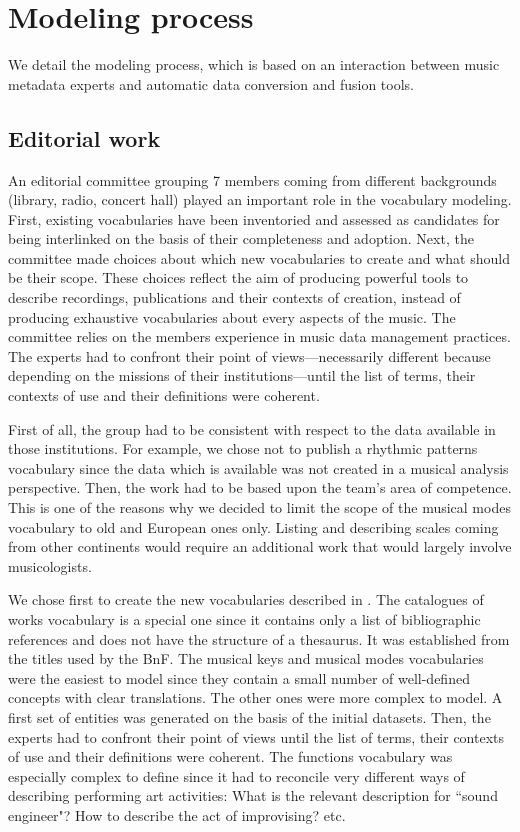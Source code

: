 \documentclass{article}
\newcommand{\etc}{etc.}
\begin{document}
\section{Modeling process}\label{sec:realisation}
We detail the modeling process, which is based on an interaction between music metadata experts and automatic data conversion and fusion tools.

\subsection{Editorial work}
An editorial committee grouping 7 members coming from different backgrounds (library, radio, concert hall) played an important role in the vocabulary modeling. First, existing vocabularies have been inventoried and assessed as candidates for being interlinked on the basis of their completeness and adoption. Next, the committee made choices about which new vocabularies to create and what should be their scope. These choices reflect the aim of producing powerful tools to describe recordings, publications and their contexts of creation, instead of producing exhaustive vocabularies about every aspects of the music. The committee relies on the members experience in music data management practices. The experts had to confront their point of views---necessarily different because depending on the missions of their institutions---until the list of terms, their contexts of use and their definitions were coherent.

First of all, the group had to be consistent with respect to the data available in those institutions. For example, we chose not to publish a rhythmic patterns vocabulary since the data which is available was not created in a musical analysis perspective. Then, the work had to be based upon the team's area of competence. This is one of the reasons why we decided to limit the scope of the musical modes vocabulary to old and European ones only. Listing and describing scales coming from other continents would require an additional work that would largely involve musicologists. 

We chose first to create the new vocabularies described in . The catalogues of works vocabulary is a special one since it contains only a list of bibliographic references and does not have the structure of a thesaurus. It was established from the titles used by the BnF. The musical keys and musical modes vocabularies were the easiest to model since they contain a small number of well-defined concepts with clear translations. The other ones were more complex to model. A first set of entities was generated on the basis of the initial datasets. Then, the experts had to confront their point of views until the list of terms, their contexts of use and their definitions were coherent. The functions vocabulary was especially complex to define since it had to reconcile very different ways of describing performing art activities: What is the relevant description for ``sound engineer"? How to describe the act of improvising? \etc 
\end{document}
